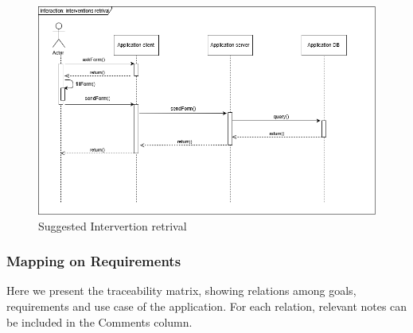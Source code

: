 	\newpage
	\begin{figure}[h!]
		\includegraphics[width=\textwidth]{Images/InterventionRetrivalSequenceDiagram}
		\caption{Suggested Intervertion retrival}
	\end{figure}
\newpage
	
	\subsubsection{Mapping on Requirements}
	Here we present the traceability matrix, showing relations among goals, requirements and use case of the application. For each relation, relevant notes can be included in the Comments column. \newline
	\medskip
	
